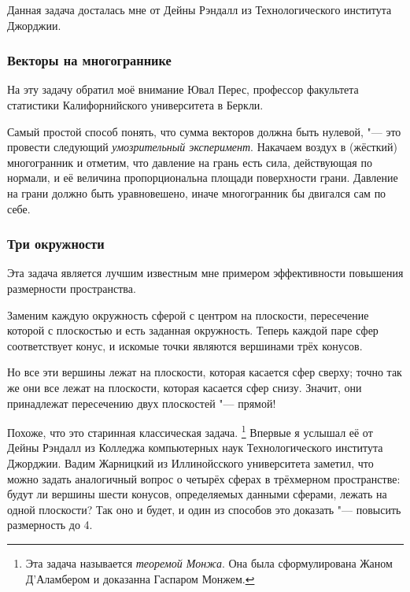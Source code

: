 \documentclass[twoside]{book}
\begin{document}
Данная задача досталась мне от Дейны Рэндалл из Технологического института Джорджии.

\subsubsection*{Векторы на многограннике}%

На эту задачу обратил моё внимание Ювал Перес, профессор факультета статистики Калифорнийского университета в Беркли. %

 
Самый простой способ понять, что сумма векторов должна быть нулевой, "--- это провести следующий \emph{умозрительный эксперимент}.
Накачаем воздух в (жёсткий) многогранник и отметим, что давление на грань есть сила, действующая по нормали, и её величина пропорциональна площади поверхности грани.
Давление на грани должно быть уравновешено, иначе многогранник бы двигался сам по себе.
\heart

\subsubsection*{Три окружности}%

Эта задача является лучшим известным мне примером эффективности повышения размерности пространства.


Заменим каждую окружность сферой с центром на плоскости, пересечение которой с плоскостью и есть заданная окружность.
Теперь каждой паре сфер соответствует конус, и искомые точки являются вершинами трёх конусов. %

Но все эти вершины лежат на плоскости, которая касается сфер сверху;
точно так же они все лежат на плоскости, которая касается сфер снизу.
Значит, они принадлежат пересечению двух плоскостей "--- прямой! \heart

Похоже, что это старинная классическая задача.%
\footnote{Эта задача называется \emph{теоремой Монжа}. Она была сформулирована Жаном Д’Аламбером и доказанна Гаспаром Монжем.}
Впервые я услышал её от Дейны Рэндалл %
из Колледжа компьютерных наук Технологического института Джорджии.
Вадим Жарницкий из Иллинойсского университета заметил, что можно задать аналогичный вопрос о четырёх сферах в трёхмерном пространстве: будут ли вершины шести конусов, определяемых данными сферами, лежать на одной плоскости?
Так оно и будет, и один из способов это доказать "--- повысить размерность до 4.
\end{document}
